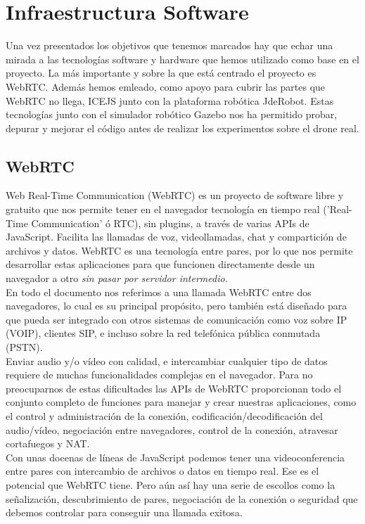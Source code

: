 \chapter{Infraestructura Software} 

Una vez presentados los objetivos que tenemos marcados hay que echar una mirada a las tecnologías software y hardware que hemos utilizado como base en el proyecto. La más importante y sobre la que está centrado el proyecto es WebRTC. Además hemos emleado, como apoyo para cubrir las partes que WebRTC no llega, ICEJS junto con la plataforma robótica JdeRobot. Estas tecnologías junto con el simulador robótico Gazebo nos ha permitido probar, depurar y mejorar el código antes de realizar los experimentos sobre el drone real.


\section{WebRTC}

Web Real-Time Communication (WebRTC) es un proyecto de software libre y gratuito que nos permite tener en el navegador tecnología en tiempo real ('Real-Time Communication' ó RTC), sin plugins, a través de varias APIs de JavaScript. Facilita las llamadas de voz, videollamadas, chat y compartición de archivos y datos. WebRTC es una tecnología entre pares, por lo que nos permite desarrollar estas aplicaciones para que funcionen directamente desde un navegador a otro \emph{sin pasar por servidor intermedio.}\\

En todo el documento nos referimos a una llamada WebRTC entre dos navegadores, lo cual es su principal propósito, pero también está diseñado para que pueda ser integrado con otros sistemas de comunicación como voz sobre IP (VOIP), clientes SIP, e incluso sobre la red telefónica pública conmutada (PSTN).\\

Enviar audio y/o vídeo con calidad, e intercambiar cualquier tipo de datos requiere de muchas funcionalidades complejas en el navegador. Para no preocuparnos de estas dificultades las APIs de WebRTC proporcionan todo el conjunto completo de funciones para manejar y crear nuestras aplicaciones, como el control y administración de la conexión, codificación/decodificación del audio/vídeo, negociación entre navegadores, control de la conexión, atravesar cortafuegos y NAT.\\

Con unas docenas de líneas de JavaScript podemos tener una videoconferencia entre pares con intercambio de archivos o datos en tiempo real. Ese es el potencial que WebRTC tiene. Pero aún así hay una serie de escollos como la señalización, descubrimiento de pares, negociación de la conexión o seguridad que debemos controlar para conseguir una llamada exitosa.\\

